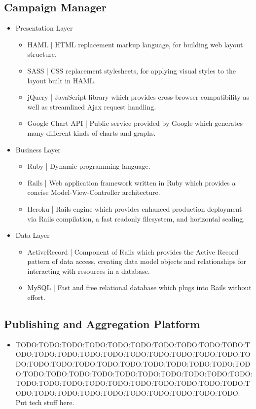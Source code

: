 \documentclass{report}
\begin{document}
\subsection{Campaign Manager}
\begin{itemize}
\item Presentation Layer
  \begin{itemize}
  \item HAML | HTML replacement markup language, for building web layout structure.
  \item SASS | CSS replacement stylesheets, for applying visual styles to the layout built in HAML.
  \item jQuery | JavaScript library which provides cross-browser compatibility as well as streamlined Ajax request handling.
  \item Google Chart API | Public service provided by Google which generates many different kinds of charts and graphs.
  \end{itemize}
\item Business Layer
  \begin{itemize}
  \item Ruby | Dynamic programming language.
  \item Rails | Web application framework written in Ruby which provides a concise Model-View-Controller architecture.
  \item Heroku | Rails engine which provides enhanced production deployment via Rails compilation, a fast readonly filesystem, and horizontal scaling.
  \end{itemize}
\item Data Layer
  \begin{itemize}
  \item ActiveRecord | Component of Rails which provides the Active Record pattern of data access, creating data model objects and relationships for interacting with resources in a database.
  \item MySQL | Fast and free relational database which plugs into Rails without effort.
  \end{itemize}
\end{itemize}
\subsection{Publishing and Aggregation Platform}
\begin{itemize}
\item TODO:TODO:TODO:TODO:TODO:TODO:TODO:TODO:TODO:TODO:TODO:TODO:TODO:TODO:TODO:TODO:TODO:TODO:TODO:TODO:TODO:TODO:TODO:TODO:TODO:TODO:TODO:TODO:TODO:TODO:TODO:TODO:TODO:TODO:TODO:TODO:TODO:TODO:TODO:TODO:TODO:TODO:TODO:TODO:TODO:TODO:TODO:TODO:TODO:TODO:TODO:TODO:TODO:TODO:TODO:TODO:TODO:TODO:TODO:TODO:TODO: Put tech stuff here.
\end{itemize}
\end{document}
